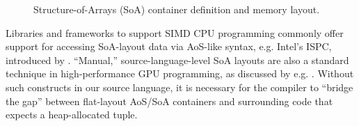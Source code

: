\begin{figure}[htbp]
\begin{subfigure}[t]{0.53\textwidth}
  \end{subfigure}
  \caption{Structure-of-Arrays (SoA) container definition and memory layout.}
  \label{fig:cpp_soa_diagram}
\end{figure}


Libraries and frameworks to support SIMD CPU programming commonly offer support
for accessing SoA-layout data via AoS-like syntax, e.g. Intel's ISPC, introduced
by \citet{ispc-paper}. ``Manual,'' source-language-level SoA layouts are also a
standard technique in high-performance GPU programming, as discussed by e.g.
\citet{cuda-textbook}. Without such constructs in our source
language, it is necessary for the compiler to ``bridge the gap'' between
flat-layout AoS/SoA containers and surrounding code that expects a
heap-allocated tuple.



